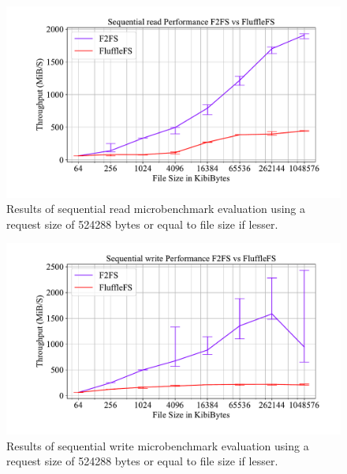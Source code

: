 \begin{figure}[h]
    \centering
	\includegraphics[width=1\textwidth]{resources/images/results-sequential.pdf}
	\caption{Results of sequential read microbenchmark evaluation using a request
        size of 524288 bytes or equal to file size if lesser.}
    \label{figure:readsequential}
\end{figure}

\begin{figure}[h]
    \centering
	\includegraphics[width=1\textwidth]{resources/images/results-sequential-write.pdf}
	\caption{Results of sequential write microbenchmark evaluation using a request
        size of 524288 bytes or equal to file size if lesser.}
    \label{figure:writesequential}
\end{figure}


